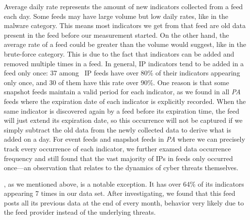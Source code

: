 Average daily rate represents the amount of new indicators collected from a feed each day.
Some feeds may have large volume but low daily rates, like {\feedfeodo} in the malware
category. This means most indicators we get from that feed are old data present in the feed before our
measurement started. On the other hand, the average rate of a feed could be
greater than the volume would suggest, like {\feednothink} in the brute-force category.
This is due to the fact that indicators can be added and removed multiple times in a
feed. In general, IP indicators tend to be added in a feed only once: 37 among \numipfeeds\
IP feeds have over 80\% of their indicators appearing only once, and 30 of them have this rate over 90\%.
One reason is that some snapshot feeds maintain a valid period for each indicator, as
we found in all \emph{PA} feeds where the expiration date of each indicator is explicitly
recorded. When the same indicator is discovered again by a feed before its expiration time,
the feed will just extend its expiration date, so this occurrence will not be captured
if we simply subtract the old data from the newly collected data to derive what is added on a day.
For event feeds and snapshot feeds in \emph{PA} where we can precisely track every occurrence
of each indicator, we further examed data occurrence frequency and still found that the vast
majority of IPs in feeds only occurred once---an observation that relates to the dynamics
of cyber threats themselves.

\feednothink, as we mentioned above, is a notable exception. It has over 64\% of its
indicators appearing 7 times in our data set. After investigating, we
found that this feed posts all its previous data at the end of every month, behavior very likely
due to the feed provider instead of the underlying threats.

